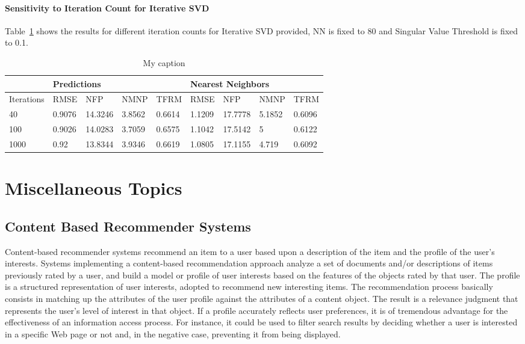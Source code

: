 \paragraph{Sensitivity to Iteration Count for Iterative SVD}
Table~\ref{tab:IterationCountSweep} shows the results for different iteration counts for Iterative SVD provided, NN is fixed to 80 and Singular Value Threshold is fixed to 0.1.
\begin{table}[]
\centering
\caption{My caption}
\label{tab:IterationCountSweep}
\begin{tabular}{|l|l|l|l|l|l|l|l|l|}
\hline
           & \multicolumn{4}{l|}{Predictions}   & \multicolumn{4}{l|}{Nearest Neighbors} \\ \hline
Iterations & RMSE   & NFP     & NMNP   & TFRM   & RMSE    & NFP      & NMNP    & TFRM    \\ \hline
40         & 0.9076 & 14.3246 & 3.8562 & 0.6614 & 1.1209  & 17.7778  & 5.1852  & 0.6096  \\ \hline
100        & 0.9026 & 14.0283 & 3.7059 & 0.6575 & 1.1042  & 17.5142  & 5       & 0.6122  \\ \hline
1000       & 0.92   & 13.8344 & 3.9346 & 0.6619 & 1.0805  & 17.1155  & 4.719   & 0.6092  \\ \hline
\end{tabular}
\end{table}
  \section{Miscellaneous Topics}
  \subsection{Content Based Recommender Systems}

 Content-based recommender systems recommend an item to a user based upon a description of the item and the profile of the user’s interests. Systems implementing a content-based recommendation approach analyze a set of documents and/or descriptions of items previously rated by a user, and build a model or profile of user interests based on the features of the objects rated by that user. The profile is a structured representation of user interests, adopted to recommend new interesting items. The recommendation process basically consists in matching up the attributes of the user profile against the attributes of a content object. The result is a relevance judgment that represents the user’s level of interest in that object. If a profile accurately reflects user preferences, it is of tremendous advantage for the effectiveness of an information access process. For instance, it could be used to filter search results by deciding whether a user is interested in a specific Web page or not and, in the negative case, preventing it from being displayed.
